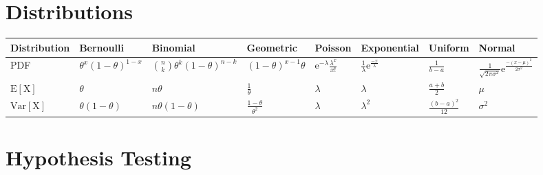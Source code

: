 \documentclass[10pt]{extarticle}
\begin{document}
\section{Distributions}

\begin{center}
    \begin{tabular}{ | l || l | l | l | l || l | l | l | }
    \hline
    Distribution & Bernoulli & Binomial & Geometric & Poisson & Exponential & Uniform & Normal \\ \hline

    PDF & $\theta^x(1-\theta)^{1-x}$ 
        & $\binom{n}{k}\theta^k(1-\theta)^{n-k}$
        & $(1-\theta)^{x-1}\theta$ 
        & $\mathrm{e}^{-\lambda}\frac{\lambda^x}{x!}$
        & $\frac{1}{\lambda}\mathrm{e}^{\frac{-x}{\lambda}}$ 
        & $\frac{1}{b-a}$ 
        & $\frac{1}{\sqrt{2\pi\sigma^2}}\mathrm{e}^{\frac{-(x-\mu)^2}{2\sigma^2}}$ \\ \hline

    $\mathrm{E[X]}$ & $\theta$ 
                    & $n\theta$ 
                    & $\frac{1}{\theta}$ 
                    & $\lambda$ 
                    & $\lambda$ 
                    & $\frac{a+b}{2}$
                    & $\mu$ \\ \hline

    $\mathrm{Var[X]}$ & $\theta(1-\theta)$
                      & $n\theta(1-\theta)$
                      & $\frac{1-\theta}{\theta^2}$ 
                      & $\lambda$
                      & $\lambda^2$
                      & $\frac{(b-a)^2}{12}$
                      & $\sigma^2$ \\ \hline
    \end{tabular}
\end{center}


\section{Hypothesis Testing}
\end{document}
